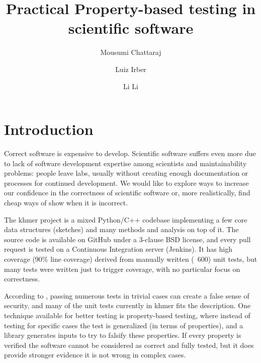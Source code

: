 \documentclass[preprint,nocopyrightspace]{sig-alternate}
\begin{document}
%

\title{Practical Property-based testing in scientific software}

\author{Mousumi Chattaraj}
\author{Luiz Irber}
\author{Li Li}


\maketitle

\begin{abstract}
\end{abstract}

\section{Introduction}
Correct software is expensive to develop.
Scientific software suffers even more due to lack of software development expertise among scientists and maintainability problems:
people leave labs,
usually without creating enough documentation or processes for continued development.
We would like to explore ways to increase our confidence in the correctness of scientific software or,
more realistically,
find cheap ways of show when it is incorrect.

The khmer project is a mixed Python/C++ codebase implementing a few core data structures (sketches) and many methods and analysis on top of it.
The source code is available on GitHub under a 3-clause BSD license,
and every pull request is tested on a Continuous Integration server (Jenkins).
It has high coverage (90\% line coverage) derived from manually written (~600) unit tests,
but many tests were written just to trigger coverage,
with no particular focus on correctness.

According to \citet{claessen_quickcheck:_2011},
passing numerous tests in trivial cases can create a false sense of security,
and many of the unit tests currently in khmer fits the description.
One technique available for better testing is property-based testing,
where instead of testing for specific cases the test is generalized (in terms of properties),
and a library generates inputs to try to falsify these properties.
If every property is verified the software cannot be considered as correct and fully tested,
but it does provide stronger evidence it is not wrong in complex cases.
\end{document}
